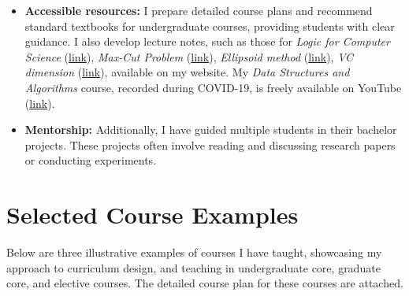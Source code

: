 \documentclass[11pt,a4paper,sans]{moderncv} %
\begin{document}
\begin{itemize}
    \item \textbf{Accessible resources:} I prepare detailed course plans and recommend standard textbooks for undergraduate courses, providing students with clear guidance. I also develop lecture notes, such as those for \emph{Logic for Computer Science} (\href{http://www.iitgoa.ac.in/~sreejithav/18July/logic/logicNotes.pdf}{link}), \emph{Max-Cut Problem} (\href{http://www.iitgoa.ac.in/~sreejithav/misc/maxcut.pdf}{link}), \emph{Ellipsoid method} (\href{http://www.iitgoa.ac.in/~sreejithav/misc/ellipsoid.pdf}{link}), \emph{VC dimension} (\href{http://www.iitgoa.ac.in/~sreejithav/misc/erm.pdf}{link}), available on my website. My \emph{Data Structures and Algorithms} course, recorded during COVID-19, is freely available on YouTube (\href{https://www.youtube.com/playlist?list=PLgOvAyZGFRoSKBxqG9lbhtz9cVeLDsZnp}{link}).


    \item \textbf{Mentorship:} Additionally, I have guided multiple students in their bachelor projects. These projects often involve reading and discussing research papers or conducting experiments.

\end{itemize}

\section{Selected Course Examples}
Below are three illustrative examples of courses I have taught, showcasing my approach to curriculum design, and teaching in undergraduate core, graduate core, and elective courses. The detailed course plan for these courses are attached.
\end{document}
